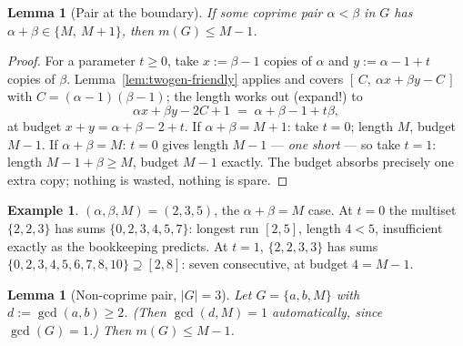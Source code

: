 \documentclass[11pt,reqno]{amsart}
\theoremstyle{plain}
\newtheorem{lemma}[theorem]{Lemma}
\theoremstyle{definition}
\newtheorem{example}[theorem]{Example}
\theoremstyle{remark}
\begin{document}
\begin{lemma}[Pair at the boundary]\label{lem:L2-friendly}
If some coprime pair $\alpha < \beta$ in $G$ has $\alpha + \beta \in \{M,\ M+1\}$,
then $m(G) \le M - 1$.
\end{lemma}

\begin{proof}
For a parameter $t \ge 0$, take $x := \beta - 1$ copies of $\alpha$ and
$y := \alpha - 1 + t$ copies of $\beta$. Lemma~\ref{lem:twogen-friendly} applies
and covers $[\,C,\ \alpha x + \beta y - C\,]$ with $C = (\alpha-1)(\beta-1)$; the
length works out (expand!) to
\[
  \alpha x + \beta y - 2C + 1 \;=\; \alpha + \beta - 1 + t\beta ,
\]
at budget $x + y = \alpha + \beta - 2 + t$. If $\alpha + \beta = M + 1$: take
$t = 0$; length $M$, budget $M - 1$. If $\alpha + \beta = M$: $t = 0$ gives
length $M - 1$ --- \emph{one short} --- so take $t = 1$: length $M - 1 + \beta \ge
M$, budget $M - 1$ exactly. The budget absorbs precisely one extra copy; nothing
is wasted, nothing is spare.
\end{proof}

\begin{example}
$(\alpha, \beta, M) = (2, 3, 5)$, the $\alpha + \beta = M$ case. At $t = 0$ the
multiset $\{2,2,3\}$ has sums $\{0,2,3,4,5,7\}$: longest run $[2,5]$, length $4 <
5$, insufficient exactly as the bookkeeping predicts. At $t = 1$, $\{2,2,3,3\}$
has sums $\{0,2,3,4,5,6,7,8,10\} \supseteq [2,8]$: seven consecutive, at budget
$4 = M-1$.
\end{example}

\begin{lemma}[Non-coprime pair, $|G| = 3$]\label{lem:L3-friendly}
Let $G = \{a, b, M\}$ with $d := \gcd(a, b) \ge 2$. (Then $\gcd(d, M) = 1$
automatically, since $\gcd(G) = 1$.) Then $m(G) \le M - 1$.
\end{lemma}
\end{document}

